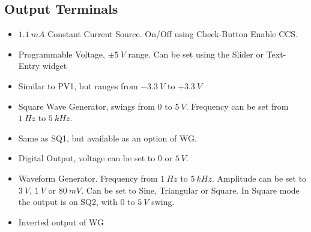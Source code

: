 \documentclass[a4paper,12pt,english]{sphinxmanual}
\let\sphinxpxdimen\pdfpxdimen\else\newdimen\sphinxpxdimen
\begin{document}
\subsection{Output Terminals}
\label{\detokenize{3.0:output-terminals}}\begin{itemize}
\item {} 
 \(1.1\ mA\) Constant Current Source. On/Off using Check-Button
Enable CCS.

\item {} 
 Programmable Voltage, \(\pm 5\ V\) range. Can be set using the
Slider or Text-Entry widget

\item {} 
 Similar to PV1, but ranges from \(- 3.3\ V\) to \(+ 3.3\ V\)

\item {} 
 Square Wave Generator, swings from \(0\) to \(5\ V\).
Frequency can be set from \(1\ Hz\) to \(5\ kHz\).

\item {} 
 Same as SQ1, but available as an option of WG.

\item {} 
 Digital Output, voltage can be set to \(0\) or \(5\ V\).

\item {} 
 Waveform Generator. Frequency from \(1\ Hz\) to \(5\ kHz\).
Amplitude can be set to \(3\ V\), \(1\ V\) or \(80\ mV\).
Can be set to Sine, Triangular or Square.
In Square mode the output is on SQ2, with \(0\) to \(5\ V\) swing.

\item {} 
 Inverted output of WG

\end{itemize}

\begin{figure}[htbp]
\centering

\noindent\sphinxincludegraphics[width=300\sphinxpxdimen]{{scope-inputs}.pdf}
\end{figure}
\end{document}
